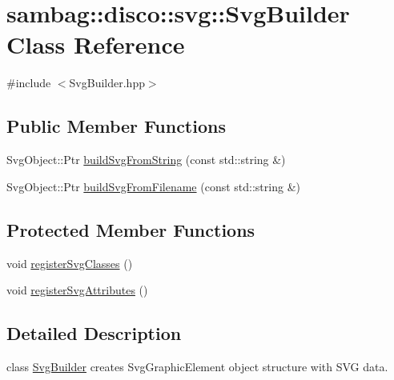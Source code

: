 \hypertarget{classsambag_1_1disco_1_1svg_1_1_svg_builder}{
\section{sambag::disco::svg::SvgBuilder Class Reference}
\label{classsambag_1_1disco_1_1svg_1_1_svg_builder}
}


{\ttfamily \#include $<$SvgBuilder.hpp$>$}

\subsection*{Public Member Functions}
\begin{DoxyCompactItemize}
\item 
SvgObject::Ptr \hyperlink{classsambag_1_1disco_1_1svg_1_1_svg_builder_a84dadea0287e483ec0cf62cfaf5d86dd}{buildSvgFromString} (const std::string \&)
\item 
SvgObject::Ptr \hyperlink{classsambag_1_1disco_1_1svg_1_1_svg_builder_a6c4e7ae81b4a3f8b5e5b5be96e3d93b5}{buildSvgFromFilename} (const std::string \&)
\end{DoxyCompactItemize}
\subsection*{Protected Member Functions}
\begin{DoxyCompactItemize}
\item 
void \hyperlink{classsambag_1_1disco_1_1svg_1_1_svg_builder_a2bb5d356ae5d56626670ed0996eed88b}{registerSvgClasses} ()
\item 
void \hyperlink{classsambag_1_1disco_1_1svg_1_1_svg_builder_a9be171dcdb5ab7417a89045f1fb2c8d1}{registerSvgAttributes} ()
\end{DoxyCompactItemize}


\subsection{Detailed Description}
class \hyperlink{classsambag_1_1disco_1_1svg_1_1_svg_builder}{SvgBuilder} creates SvgGraphicElement object structure with SVG data. 

